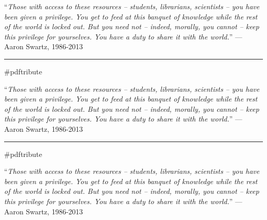 \documentclass{article}
\begin{document}
``\textit{Those with access to these resources -- students, librarians,
scientists -- you have been given a privilege. You get to feed at this
banquet of knowledge while the rest of the world is locked out. But you need
not -- indeed, morally, you cannot -- keep this privilege for yourselves. You
have a duty to share it with the world.}'' --- Aaron Swartz, 1986-2013

\vspace{0.25in}
\rule{6in}{1px}
\vspace{0.1in}

\begin{center}
    {\Huge\#pdftribute}
\end{center}

``\textit{Those with access to these resources -- students, librarians,
scientists -- you have been given a privilege. You get to feed at this
banquet of knowledge while the rest of the world is locked out. But you need
not -- indeed, morally, you cannot -- keep this privilege for yourselves. You
have a duty to share it with the world.}'' --- Aaron Swartz, 1986-2013

\vspace{0.25in}
\rule{6in}{1px}
\vspace{0.1in}

\begin{center}
    {\Huge\#pdftribute}
\end{center}

``\textit{Those with access to these resources -- students, librarians,
scientists -- you have been given a privilege. You get to feed at this
banquet of knowledge while the rest of the world is locked out. But you need
not -- indeed, morally, you cannot -- keep this privilege for yourselves. You
have a duty to share it with the world.}'' --- Aaron Swartz, 1986-2013
\end{document}
